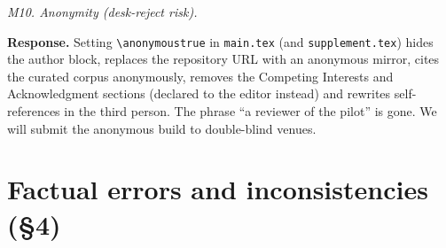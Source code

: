 \documentclass[10pt,a4paper]{article}
\newenvironment{referee}{\par\medskip\noindent\begin{minipage}{\linewidth}\color{black!65}\itshape}{\end{minipage}\par\smallskip}
\newcommand{\resp}{\noindent\textbf{Response.} }
\begin{document}
\begin{referee}M10. Anonymity (desk-reject risk).\end{referee}
\resp Setting \verb|\anonymoustrue| in \texttt{main.tex} (and \texttt{supplement.tex}) hides the author block, replaces the repository URL with an anonymous mirror, cites the curated corpus anonymously, removes the Competing Interests and Acknowledgment sections (declared to the editor instead) and rewrites self-references in the third person. The phrase ``a reviewer of the pilot'' is gone. We will submit the anonymous build to double-blind venues.

\section*{Factual errors and inconsistencies (\S4)}
\end{document}
